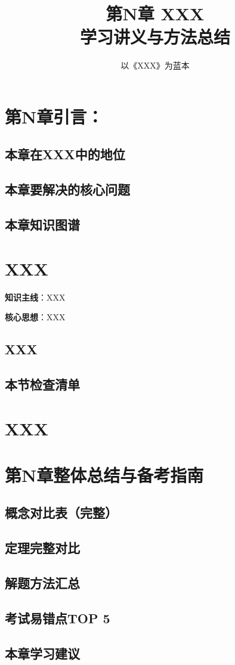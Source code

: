 \documentclass[11pt,a4paper]{article}
\title{第N章 XXX\\\Large 学习讲义与方法总结}
\author{以《XXX》为蓝本}
\date{}
\begin{document}
\maketitle
\tableofcontents
\newpage

\section{第N章引言：}

\subsection{本章在XXX中的地位}

\subsection{本章要解决的核心问题}

\subsection{本章知识图谱}

\newpage
\section{XXX}

\begin{summarybox}
\textbf{知识主线}：XXX

\textbf{核心思想}：XXX
\end{summarybox}

\subsection{XXX}

\subsection{本节检查清单}

\newpage
\section{XXX}

\newpage
\section{第N章整体总结与备考指南}

\subsection{概念对比表（完整）}

\subsection{定理完整对比}

\subsection{解题方法汇总}

\subsection{考试易错点TOP 5}

\subsection{本章学习建议}
\end{document}
